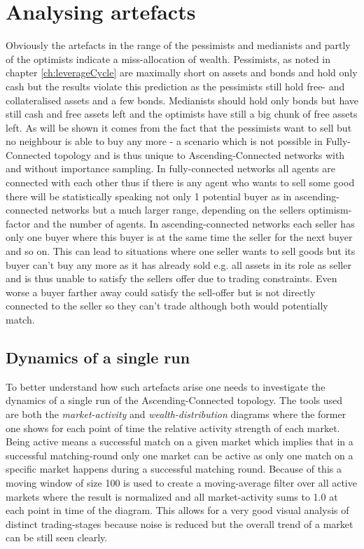 \documentclass[Bachelorarbeit.tex]{subfiles}
\begin{document}
\section{Analysing artefacts}
Obviously the artefacts in the range of the pessimists and medianists and partly of the optimists indicate a miss-allocation of wealth. Pessimists, as noted in chapter \ref{ch:leverageCycle} are maximally short on assets and bonds and hold only cash but the results violate this prediction as the pessimists still hold free- and collateralised assets and a few bonds. Medianists should hold only bonds but have still cash and free assets left and the optimists have still a big chunk of free assets left. As will be shown it comes from the fact that the pessimists want to sell but no neighbour is able to buy any more - a scenario which is not possible in Fully-Connected topology and is thus unique to Ascending-Connected networks with and without importance sampling. In fully-connected networks all agents are connected with each other thus if there is any agent who wants to sell some good there will be statistically speaking not only 1 potential buyer as in ascending-connected networks but a much larger range, depending on the sellers optimism-factor and the number of agents. In ascending-connected networks each seller has only one buyer where this buyer is at the same time the seller for the next buyer and so on. This can lead to situations where one seller wants to sell goods but its buyer can't buy any more as it has already sold e.g. all assets in its role as seller and is thus unable to satisfy the sellers offer due to trading constraints. Even worse a buyer farther away could satisfy the sell-offer but is not directly connected to the seller so they can't trade although both would potentially match.

\subsection{Dynamics of a single run}
\label{sub:dynamics_singlerun}
To better understand how such artefacts arise one needs to investigate the dynamics of a single run of the Ascending-Connected topology. The tools used are both the \textit{market-activity} and \textit{wealth-distribution} diagrams where the former one shows for each point of time the relative activity strength of each market. Being active means a successful match on a given market which implies that in a successful matching-round only one market can be active as only one match on a specific market happens during a successful matching round. Because of this a moving window of size 100 is used to create a moving-average filter over all active markets where the result is normalized and all market-activity sums to 1.0 at each point in time of the diagram. This allows for a very good visual analysis of distinct trading-stages because noise is reduced but the overall trend of a market can be still seen clearly.
\end{document}
